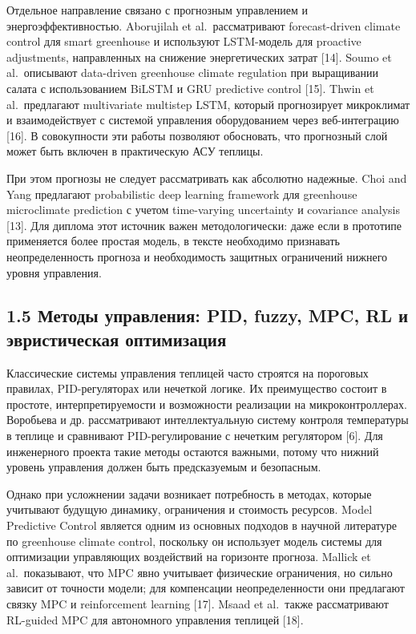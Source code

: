 \documentclass[a4paper,14pt]{extarticle}
\begin{document}
Отдельное направление связано с прогнозным управлением и
энергоэффективностью. Aborujilah et al.~рассматривают forecast-driven
climate control для smart greenhouse и используют LSTM-модель для
proactive adjustments, направленных на снижение энергетических затрат
{[}14{]}. Soumo et al.~описывают data-driven greenhouse climate
regulation при выращивании салата с использованием BiLSTM и GRU
predictive control {[}15{]}. Thwin et al.~предлагают multivariate
multistep LSTM, который прогнозирует микроклимат и взаимодействует с
системой управления оборудованием через веб-интеграцию {[}16{]}. В
совокупности эти работы позволяют обосновать, что прогнозный слой может
быть включен в практическую АСУ теплицы.

При этом прогнозы не следует рассматривать как абсолютно надежные. Choi
and Yang предлагают probabilistic deep learning framework для greenhouse
microclimate prediction с учетом time-varying uncertainty и covariance
analysis {[}13{]}. Для диплома этот источник важен методологически: даже
если в прототипе применяется более простая модель, в тексте необходимо
признавать неопределенность прогноза и необходимость защитных
ограничений нижнего уровня управления.

\hypertarget{ux43cux435ux442ux43eux434ux44b-ux443ux43fux440ux430ux432ux43bux435ux43dux438ux44f-pid-fuzzy-mpc-rl-ux438-ux44dux432ux440ux438ux441ux442ux438ux447ux435ux441ux43aux430ux44f-ux43eux43fux442ux438ux43cux438ux437ux430ux446ux438ux44f}{%
\subsection{1.5 Методы управления: PID, fuzzy, MPC, RL и эвристическая
оптимизация}\label{ux43cux435ux442ux43eux434ux44b-ux443ux43fux440ux430ux432ux43bux435ux43dux438ux44f-pid-fuzzy-mpc-rl-ux438-ux44dux432ux440ux438ux441ux442ux438ux447ux435ux441ux43aux430ux44f-ux43eux43fux442ux438ux43cux438ux437ux430ux446ux438ux44f}}

Классические системы управления теплицей часто строятся на пороговых
правилах, PID-регуляторах или нечеткой логике. Их преимущество состоит в
простоте, интерпретируемости и возможности реализации на
микроконтроллерах. Воробьева и др. рассматривают интеллектуальную
систему контроля температуры в теплице и сравнивают PID-регулирование с
нечетким регулятором {[}6{]}. Для инженерного проекта такие методы
остаются важными, потому что нижний уровень управления должен быть
предсказуемым и безопасным.

Однако при усложнении задачи возникает потребность в методах, которые
учитывают будущую динамику, ограничения и стоимость ресурсов. Model
Predictive Control является одним из основных подходов в научной
литературе по greenhouse climate control, поскольку он использует модель
системы для оптимизации управляющих воздействий на горизонте прогноза.
Mallick et al.~показывают, что MPC явно учитывает физические
ограничения, но сильно зависит от точности модели; для компенсации
неопределенности они предлагают связку MPC и reinforcement learning
{[}17{]}. Msaad et al.~также рассматривают RL-guided MPC для автономного
управления теплицей {[}18{]}.
\end{document}
